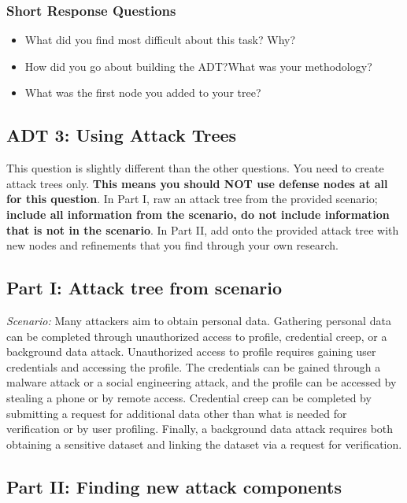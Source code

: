 \subsubsection{Short Response Questions}
\begin{itemize}
  \setlength{\itemindent}{\qIndent}
  \item[\surveyq{LS-ADT2-W1}] What did you find most difficult about this task? Why?
  \item[\surveyq{LS-ADT2-W2}] How did you go about building the ADT?\@ What was your methodology?
  \item[\surveyq{LS-ADT2-W3}] What was the first node you added to your tree?
\end{itemize}


\subsection{ADT 3: Using Attack Trees}
This question is slightly different than the other questions. You need to create attack trees only. \textbf{This means you should NOT use defense nodes at all for this question}. In Part I, raw an attack tree from the provided scenario; \textbf{include all information from the scenario, do not include information that is not in the scenario}. In Part II, add onto the provided attack tree with new nodes and refinements that you find through your own research.

\subsection*{Part I: Attack tree from scenario}

\emph{Scenario:}  Many attackers aim to obtain personal data. Gathering personal data can be completed through unauthorized access to profile, credential creep, or a background data attack. Unauthorized access to profile requires gaining user credentials and accessing the profile. The credentials can be gained through a malware attack or a social engineering attack, and the profile can be accessed by stealing a phone or by remote access. Credential creep can be completed by submitting a request for additional data other than what is needed for verification or by user profiling. Finally, a background data attack requires both obtaining a sensitive dataset and linking the dataset via a request for verification. 


\subsection*{Part II: Finding new attack components}


